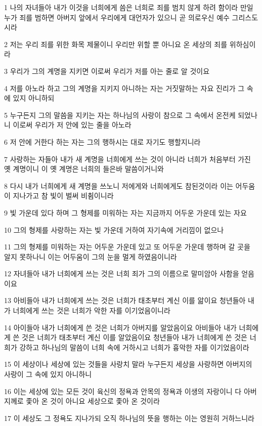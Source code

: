 \par 1 나의 자녀들아 내가 이것을 너희에게 씀은 너희로 죄를 범치 않게 하려 함이라 만일 누가 죄를 범하면 아버지 앞에서 우리에게 대언자가 있으니 곧 의로우신 예수 그리스도시라
\par 2 저는 우리 죄를 위한 화목 제물이니 우리만 위할 뿐 아니요 온 세상의 죄를 위하심이라
\par 3 우리가 그의 계명을 지키면 이로써 우리가 저를 아는 줄로 알 것이요
\par 4 저를 아노라 하고 그의 계명을 지키지 아니하는 자는 거짓말하는 자요 진리가 그 속에 있지 아니하되
\par 5 누구든지 그의 말씀을 지키는 자는 하나님의 사랑이 참으로 그 속에서 온전케 되었나니 이로써 우리가 저 안에 있는 줄을 아노라
\par 6 저 안에 거한다 하는 자는 그의 행하시는 대로 자기도 행할지니라
\par 7 사랑하는 자들아 내가 새 계명을 너희에게 쓰는 것이 아니라 너희가 처음부터 가진 옛 계명이니 이 옛 계명은 너희의 들은바 말씀이거니와
\par 8 다시 내가 너희에게 새 계명을 쓰노니 저에게와 너희에게도 참된것이라 이는 어두움이 지나가고 참 빛이 벌써 비췸이니라
\par 9 빛 가운데 있다 하며 그 형제를 미워하는 자는 지금까지 어두운 가운데 있는 자요
\par 10 그의 형제를 사랑하는 자는 빛 가운데 거하여 자기속에 거리낌이 없으나
\par 11 그의 형제를 미워하는 자는 어두운 가운데 있고 또 어두운 가운데 행하며 갈 곳을 알지 못하나니 이는 어두움이 그의 눈을 멀게 하였음이니라
\par 12 자녀들아 내가 너희에게 쓰는 것은 너희 죄가 그의 이름으로 말미암아 사함을 얻음이요
\par 13 아비들아 내가 너희에게 쓰는 것은 너희가 태초부터 계신 이를 앎이요 청년들아 내가 너희에게 쓰는 것은 너희가 악한 자를 이기었음이니라
\par 14 아이들아 내가 너희에게 쓴 것은 너희가 아버지를 알았음이요 아비들아 내가 너희에게 쓴 것은 너희가 태초부터 계신 이를 알았음이요 청년들아 내가 너희에게 쓴 것은 너희가 강하고 하나님의 말씀이 너희 속에 거하시고 너희가 흉악한 자를 이기었음이라
\par 15 이 세상이나 세상에 있는 것들을 사랑치 말라 누구든지 세상을 사랑하면 아버지의 사랑이 그 속에 있지 아니하니
\par 16 이는 세상에 있는 모든 것이 육신의 정욕과 안목의 정욕과 이생의 자랑이니 다 아버지께로 좇아 온 것이 아니요 세상으로 좇아 온 것이라
\par 17 이 세상도 그 정욕도 지나가되 오직 하나님의 뜻을 행하는 이는 영원히 거하느니라
